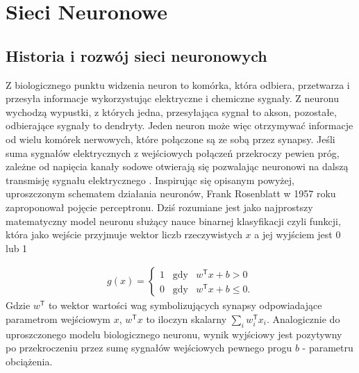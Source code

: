 \documentclass[11pt]{book}
\theoremstyle{definition}
\begin{document}
\chapter{Sieci Neuronowe}
\label{sieci}

\section{Historia i rozwój sieci neuronowych}

Z biologicznego punktu widzenia neuron to komórka, która odbiera, przetwarza i przesyła informacje wykorzystując elektryczne i chemiczne sygnały. Z neuronu wychodzą wypustki, z których jedna, przesyłająca sygnał to akson, pozostałe, odbierające sygnały to dendryty.  Jeden neuron może więc otrzymywać informacje od wielu komórek nerwowych, które połączone są ze sobą przez synapsy. Jeśli suma sygnałów elektrycznych z wejściowych połączeń przekroczy pewien próg, zależne od napięcia kanały sodowe otwierają się pozwalając neuronowi na dalszą transmisję sygnału elektrycznego \cite{NeuronyDelta}. Inspirując się opisanym powyżej, uproszczonym schematem działania neuronów, Frank Rosenblatt w 1957 roku zaproponował pojęcie perceptronu. Dziś rozumiane jest jako najprostszy matematyczny model neuronu służący nauce binarnej klasyfikacji czyli funkcji, która jako wejście przyjmuje wektor liczb rzeczywistych $x$ a jej wyjściem jest 0 lub 1

\begin{eqnarray*}
	g(x) = \begin{cases} 1 \;\;\;\text{gdy} & w^\mathsf{T}x + b > 0 \\ 0 \;\;\;\text{gdy} &w^\mathsf{T}x + b \leq 0.  \end{cases}
\end{eqnarray*}
Gdzie $w^\mathsf{T}$ to wektor wartości wag symbolizujących synapsy odpowiadające parametrom wejściowym $x$, $w^\mathsf{T} x$ to iloczyn skalarny $\sum_{i}w^\mathsf{T}_i x_i$. Analogicznie do uproszczonego modelu biologicznego neuronu, wynik wyjściowy jest pozytywny po przekroczeniu przez sumę sygnałów wejściowych pewnego progu $b$ - parametru obciążenia. 
\end{document}
